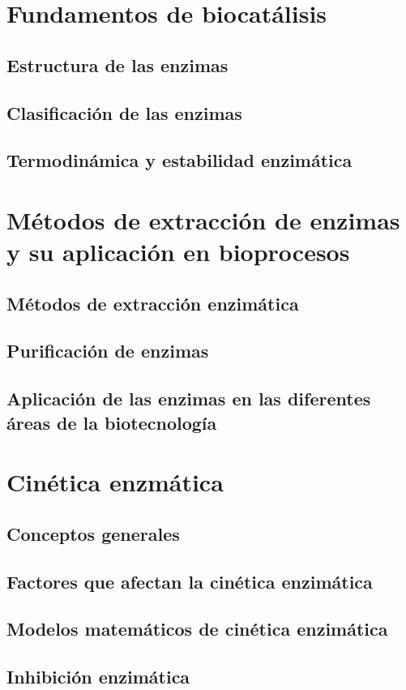 \documentclass{../summarie}
\begin{document}
\Portada
\Indice
\fancystyle
\onehalfspacing


\part{Fundamentos de biocatálisis}

    \chapter{Estructura de las enzimas}
    \chapter{Clasificación de las enzimas}
    \chapter{Termodinámica y estabilidad enzimática}
    
\part{Métodos de extracción de enzimas y su aplicación en bioprocesos}

    \chapter{Métodos de extracción enzimática}
        
    
    \chapter{Purificación de enzimas}
        
        
    \chapter{Aplicación de las enzimas en las diferentes áreas de la biotecnología}

\part{Cinética enzmática}

    \chapter{Conceptos generales}
        
        
    \chapter{Factores que afectan la cinética enzimática}
    \chapter{Modelos matemáticos de cinética enzimática}
        
    
    \chapter{Inhibición enzimática}


\newpage 
\end{document}
